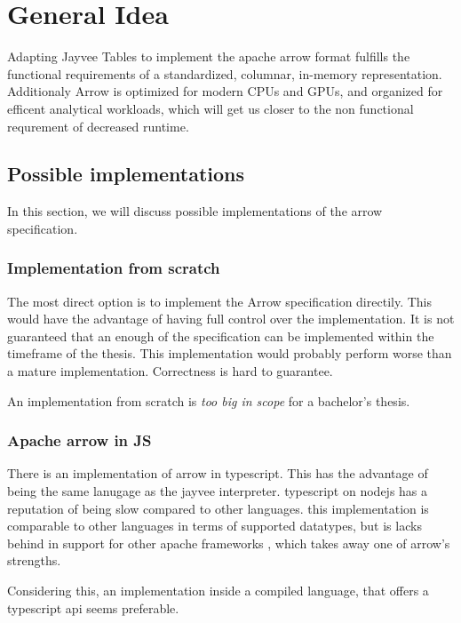 \section{General Idea}
\label{section:General Idea}

Adapting Jayvee Tables to implement the apache arrow format fulfills the functional requirements of a standardized, columnar, in-memory representation.
Additionaly Arrow is optimized for modern CPUs and GPUs, and organized for efficent analytical workloads, which will get us closer to the non functional requrement of decreased runtime. %

\subsection{Possible implementations}
\label{subsection:arrow implementations}

In this section, we will discuss possible implementations of the arrow specification.

\subsubsection{Implementation from scratch}
\label{subsubsection:direct_implementation}
The most direct option is to implement the Arrow specification directily.
This would have the advantage of having full control over the implementation.
It is not guaranteed that an enough of the specification can be implemented within the timeframe of the thesis.
This implementation would probably perform worse than a mature implementation.
Correctness is hard to guarantee.

An implementation from scratch is \emph{too big in scope} for a bachelor's thesis.

\subsubsection{Apache arrow in JS}
\label{subsubsection:arrow_in_js}
There is an implementation of arrow in typescript.
This has the advantage of being the same lanugage as the jayvee interpreter.
typescript on nodejs has a reputation of being slow compared to other languages. %
this implementation is comparable to other languages in terms of supported datatypes, but is lacks behind in support for other apache frameworks \autocite{arrow:status}, which takes away one of arrow's strengths.

Considering this, an implementation inside a compiled language, that offers a typescript api seems preferable.

